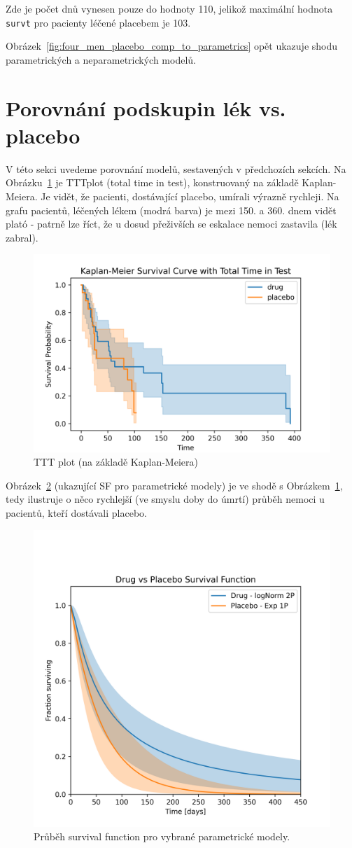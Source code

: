 \documentclass[a4, 11pt]{article}
\theoremstyle{definition}
\theoremstyle{remark}
\begin{document}
	Zde je počet dnů vynesen pouze do hodnoty 110, jelikož maximální hodnota \texttt{survt} pro pacienty léčené placebem je 103.
    
    Obrázek~\ref{fig:four_men_placebo_comp_to_parametrics} opět ukazuje shodu parametrických a neparametrických modelů.
	
	
	\section{Porovnání podskupin lék vs. placebo} \label{sec:comparison_drug_vs_placebo}
	V této sekci uvedeme porovnání modelů, sestavených v předchozích sekcích. Na Obrázku~\ref{fig:TTTplot} je TTTplot (total time in test), konstruovaný na základě Kaplan-Meiera. 
    Je vidět, že pacienti, dostávající placebo, umírali výrazně rychleji. Na grafu pacientů, léčených lékem (modrá barva) je mezi 150. a 360. dnem vidět plató - patrně lze říct, že u dosud přeživších se eskalace nemoci zastavila (lék zabral).

	\begin{figure}[H]
        \centering
        \includegraphics[width=0.5\linewidth]{img/TTTplot_using_KM.png}
        \caption{TTT plot (na základě Kaplan-Meiera)}
        \label{fig:TTTplot}
    \end{figure}
    
    Obrázek~\ref{fig:SF_for_parametric} (ukazující SF pro parametrické modely) je ve shodě s Obrázkem~\ref{fig:TTTplot}, tedy ilustruje o něco rychlejší (ve smyslu doby do úmrtí) průběh nemoci u pacientů, kteří dostávali placebo.
    
   	\begin{figure}[H]
        \centering
        \includegraphics[width=0.5\linewidth]{img/survival_function_drug_vs_placebo_parametric.png}
        \caption{Průběh survival function pro vybrané parametrické modely.}
        \label{fig:SF_for_parametric}
    \end{figure}
    
\end{document}
